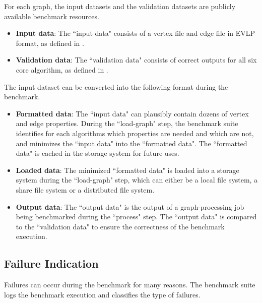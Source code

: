 For each graph, the input datasets and the validation datasets are publicly available benchmark resources.

\begin{itemize} 
    \item \textbf{Input data}: The ``input data" consists of a vertex file and edge file in EVLP format, as defined in .
    \item \textbf{Validation data}: The ``validation data" consists of correct outputs for all six core algorithm, as defined in .
\end{itemize}

The input dataset can be converted into the following format during the benchmark.

\begin{itemize}
    \item \textbf{Formatted data}: The ``input data" can plausibly contain dozens of vertex and edge properties. During the ``load-graph" step, the benchmark suite identifies for each algorithms which properties are needed and which are not, and minimizes the ``input data" into the ``formatted data". The ``formatted data" is cached in the storage system for future uses. 
    \item \textbf{Loaded data}: The minimized ``formatted data" is loaded into a storage system during the ``load-graph" step, which can either be a local file system, a share file system or a distributed file system.
    \item \textbf{Output data}: The ``output data" is the output of a graph-processing job being benchmarked during the ``process" step. The ``output data" is compared to the ``validation data" to ensure the correctness of the benchmark execution.
\end{itemize}



\subsection{Failure Indication}
\label{sec:process:execution:failure}
Failures can occur during the benchmark for many reasons. The benchmark suite logs the benchmark execution and classifies the type of failures.


